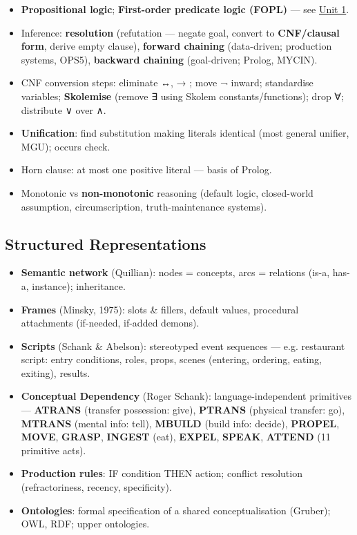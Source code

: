 \begin{itemize}
\tightlist
\item
  \textbf{Propositional logic}; \textbf{First-order predicate logic (FOPL)} --- see \protect\hyperlink{p2-01--1-mathematical-logic}{Unit 1}.
\item
  Inference: \textbf{resolution} (refutation --- negate goal, convert to \textbf{CNF/clausal form}, derive empty clause), \textbf{forward chaining} (data-driven; production systems, OPS5), \textbf{backward chaining} (goal-driven; Prolog, MYCIN).
\item
  CNF conversion steps: eliminate ↔, → ; move ¬ inward; standardise variables; \textbf{Skolemise} (remove ∃ using Skolem constants/functions); drop ∀; distribute ∨ over ∧.
\item
  \textbf{Unification}: find substitution making literals identical (most general unifier, MGU); occurs check.
\item
  Horn clause: at most one positive literal --- basis of Prolog.
\item
  Monotonic vs \textbf{non-monotonic} reasoning (default logic, closed-world assumption, circumscription, truth-maintenance systems).
\end{itemize}

\needspace{95pt}

\hypertarget{p2-10--42-structured-representations}{%
\subsection{Structured Representations}\label{p2-10--42-structured-representations}}



\begin{itemize}
\tightlist
\item
  \textbf{Semantic network} (Quillian): nodes = concepts, arcs = relations (is-a, has-a, instance); inheritance.
\item
  \textbf{Frames} (Minsky, 1975): slots \& fillers, default values, procedural attachments (if-needed, if-added demons).
\item
  \textbf{Scripts} (Schank \& Abelson): stereotyped event sequences --- e.g. restaurant script: entry conditions, roles, props, scenes (entering, ordering, eating, exiting), results.
\item
  \textbf{Conceptual Dependency} (Roger Schank): language-independent primitives --- \textbf{ATRANS} (transfer possession: give), \textbf{PTRANS} (physical transfer: go), \textbf{MTRANS} (mental info: tell), \textbf{MBUILD} (build info: decide), \textbf{PROPEL}, \textbf{MOVE}, \textbf{GRASP}, \textbf{INGEST} (eat), \textbf{EXPEL}, \textbf{SPEAK}, \textbf{ATTEND} (11 primitive acts).
\item
  \textbf{Production rules}: IF condition THEN action; conflict resolution (refractoriness, recency, specificity).
\item
  \textbf{Ontologies}: formal specification of a shared conceptualisation (Gruber); OWL, RDF; upper ontologies.
\end{itemize}

